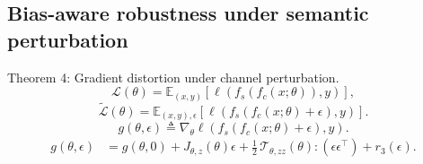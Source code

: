 \documentclass[10pt,journal]{IEEEtran}
\begin{document}
\subsection{Bias-aware robustness under semantic perturbation}
Theorem 4: Gradient distortion under channel perturbation.
\begin{equation}
\mathcal{L}(\theta)
=
\mathbb{E}_{(x,y)}\left[\ell\left(f_s(f_c(x;\theta)),y\right)\right],
\end{equation}
\begin{equation}
\tilde{\mathcal{L}}(\theta)
=
\mathbb{E}_{(x,y),\epsilon}\left[\ell\left(f_s(f_c(x;\theta)+\epsilon),y\right)\right].
\end{equation}
\begin{equation}
g(\theta,\epsilon)
\triangleq
\nabla_\theta \ell\left(f_s(f_c(x;\theta)+\epsilon),y\right).
\end{equation}
\begin{equation}
\begin{aligned}
g(\theta,\epsilon)
&=
g(\theta,0)
+
J_{\theta,z}(\theta)\epsilon
+
\frac{1}{2}\,\mathcal{T}_{\theta,zz}(\theta):\left(\epsilon\epsilon^\top\right)
+
r_3(\epsilon).
\end{aligned}
\end{equation}
\end{document}

